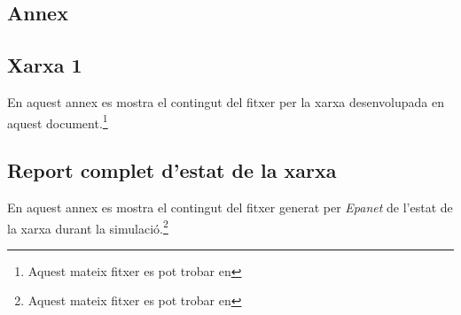 \documentclass[12pt]{article}
\begin{document}
\clearpage
\begin{appendices}
\section{Annex}
\subsection{Xarxa 1\label{ann1}}
En aquest annex es mostra el contingut del fitxer per la xarxa desenvolupada en aquest document.\footnote{Aquest mateix fitxer es pot trobar en }


\clearpage
\subsection{Report complet d'estat de la xarxa\label{ann2}}
En aquest annex es mostra el contingut del fitxer generat per \textit{Epanet} de l'estat de la xarxa durant la simulació.\footnote{Aquest mateix fitxer es pot trobar en }

\end{appendices}
\end{document}
